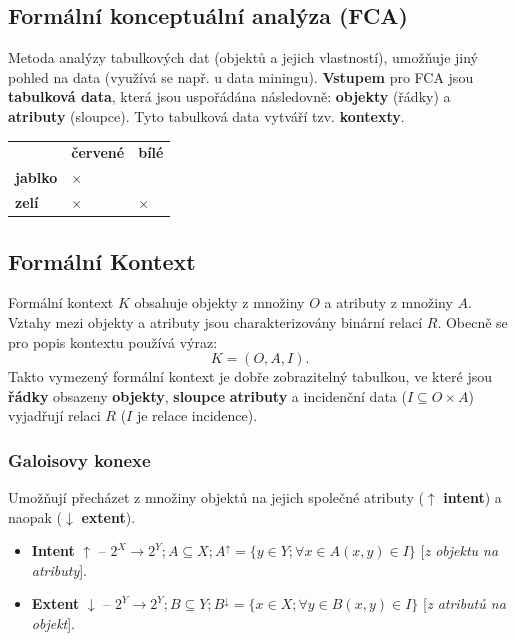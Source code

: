 \subsection{Formální konceptuální analýza (FCA)}
Metoda analýzy tabulkových dat (objektů a jejich vlastností), umožňuje jiný pohled na data (využívá se např. u data miningu). \textbf{Vstupem} pro FCA jsou \textbf{tabulková data}, která jsou uspořádána následovně: \textbf{objekty} (řádky) a \textbf{atributy} (sloupce). Tyto tabulková data vytváří tzv. \textbf{kontexty}.

\begin{table}[H]
	\centering
	\begin{tabular}{l|l|l}
		& \textbf{červené} & \textbf{bílé} \\
		\hhline
		\textbf{jablko} & $\times$                &              \\
		\textbf{zelí}   & $\times$                & $\times$           
	\end{tabular}
\end{table}

\subsection{Formální Kontext}
Formální kontext $K$ obsahuje objekty z množiny $O$ a atributy z množiny $A$. Vztahy mezi objekty a atributy jsou charakterizovány binární relací $ R $. Obecně se pro popis kontextu používá výraz:
\begin{equation}
K = (O, A, I).
\end{equation}
Takto vymezený formální kontext je dobře zobrazitelný tabulkou, ve které jsou \textbf{řádky} obsazeny \textbf{objekty}, \textbf{sloupce} \textbf{atributy} a incidenční data ($I \subseteq O \times A$) vyjadřují relaci $ R $ ($I$ je relace incidence).

\subsubsection{Galoisovy konexe}
Umožňují přecházet z množiny objektů na jejich společné atributy ($\uparrow$ \textbf{intent}) a naopak ($\downarrow$ \textbf{extent}).

\begin{itemize}
\item \textbf{Intent} $\uparrow$ -- $2^X \rightarrow 2^Y; A \subseteq X; A^\uparrow = \{y \in Y; \forall x \in A (x, y) \in I\}$ [\textit{z objektu na atributy}].
\item \textbf{Extent} $\downarrow$ -- $2^Y \rightarrow 2^Y; B \subseteq Y; B^\downarrow = \{x \in X; \forall y \in B (x, y) \in I\}$ [\textit{z atributů na objekt}].
\end{itemize}

